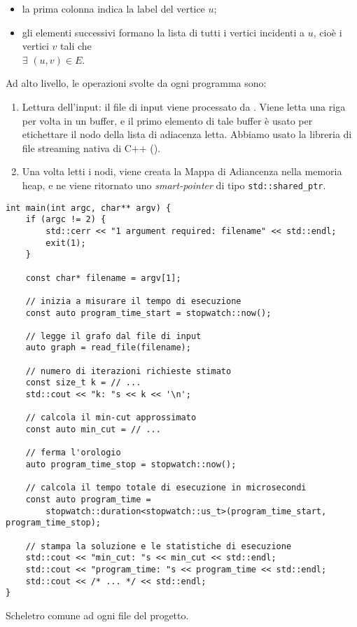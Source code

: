 \begin{itemize}
    \item la prima colonna indica la label del vertice $u$;
    \item gli elementi successivi formano la lista di tutti i vertici
      incidenti a $u$, cioè i vertici $v$ tali che \\ $\exists$ $(u, v) \in E$.
\end{itemize}

\noindent Ad alto livello, le operazioni svolte da ogni programma sono:

\begin{enumerate}
    \item Lettura dell'input: il file di input viene processato
      da . Viene letta una riga per volta in
      un buffer, e il primo elemento di tale buffer è usato per
      etichettare il nodo della lista di adiacenza letta. Abbiamo usato la libreria di file streaming nativa di
    C++ ().

    \item Una volta letti i nodi, viene creata la Mappa di Adiancenza
      nella memoria heap, e ne viene ritornato uno
      \textit{smart-pointer} di tipo
      \texttt{std::shared_ptr}.
\end{enumerate}

\begin{listing}[!ht]
\begin{verbatim}
int main(int argc, char** argv) {
    if (argc != 2) {
        std::cerr << "1 argument required: filename" << std::endl;
        exit(1);
    }

    const char* filename = argv[1];

    // inizia a misurare il tempo di esecuzione
    const auto program_time_start = stopwatch::now();

    // legge il grafo dal file di input
    auto graph = read_file(filename);

    // numero di iterazioni richieste stimato
    const size_t k = // ...
    std::cout << "k: "s << k << '\n';

    // calcola il min-cut approssimato
    const auto min_cut = // ...

    // ferma l'orologio
    auto program_time_stop = stopwatch::now();

    // calcola il tempo totale di esecuzione in microsecondi
    const auto program_time =
        stopwatch::duration<stopwatch::us_t>(program_time_start, program_time_stop);

    // stampa la soluzione e le statistiche di esecuzione
    std::cout << "min_cut: "s << min_cut << std::endl;
    std::cout << "program_time: "s << program_time << std::endl;
    std::cout << /* ... */ << std::endl;
}
\end{verbatim}
\caption{Scheletro comune ad ogni file  del progetto.}
\label{listing:main-cpp}
\end{listing}

